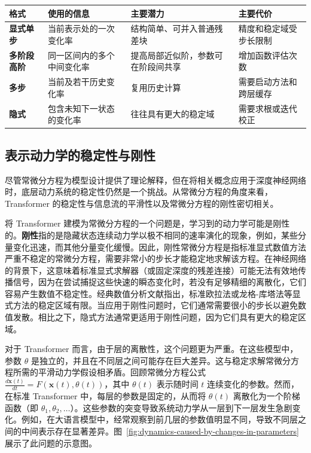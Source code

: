 \documentclass[UTF8,a4paper,zihao=-4,oneside,openany]{ctexbook}
\begin{document}
\begin{center}
\begin{tabularx}{\linewidth}{>{\bfseries}lXXX}
    \toprule
    格式 & 使用的信息 & 主要潜力 & 主要代价 \\
    \midrule
    显式单步
      & 当前表示处的一次变化率
      & 结构简单、可并入普通残差块
      & 精度和稳定域受步长限制 \\
    多阶段高阶
      & 同一区间内的多个中间变化率
      & 提高局部近似阶，参数可在阶段间共享
      & 增加函数评估次数 \\
    多步
      & 当前及若干历史变化率
      & 复用历史计算
      & 需要启动方法和跨层缓存 \\
    隐式
      & 包含未知下一状态的变化率
      & 往往具有更大的稳定域
      & 需要求根或迭代校正 \\
    \bottomrule
\end{tabularx}
\end{center}


\subsection{表示动力学的稳定性与刚性}

尽管常微分方程为模型设计提供了理论解释，但在将相关概念应用于深度神经网络时，底层动力系统的稳定性仍然是一个挑战。从常微分方程的角度来看，Transformer 的稳定性与信息流的平滑性以及常微分方程的刚性密切相关。

将 Transformer 建模为常微分方程的一个问题是，学习到的动力学可能是刚性的。\textbf{刚性}指的是隐藏状态连续动力学以极不相同的速率演化的现象，例如，某些分量变化迅速，而其他分量变化缓慢。因此，刚性常微分方程是指标准显式数值方法严重不稳定的常微分方程，需要非常小的步长才能稳定地求解该方程。在神经网络的背景下，这意味着标准显式求解器（或固定深度的残差连接）可能无法有效地传播信号，因为在尝试捕捉这些快速的瞬态变化时，若没有足够精细的离散化，它们容易产生数值不稳定性。经典数值分析文献指出，标准欧拉法或龙格-库塔法等显式方法的稳定区域有限。当应用于刚性问题时，它们通常需要很小的步长以避免数值发散。相比之下，隐式方法通常更适用于刚性问题，因为它们具有更大的稳定区域。

对于 Transformer 而言，由于层的离散性，这个问题更为严重。在这些模型中，参数 $\theta$ 是独立的，并且在不同层之间可能存在巨大差异。这与稳定求解常微分方程所需的平滑动力学假设相矛盾。回顾常微分方程公式 $\frac{d\mathbf{x}(t)}{dt} = F(\mathbf{x}(t),\theta(t))$，其中 $\theta(t)$ 表示随时间 $t$ 连续变化的参数。然而，在标准 Transformer 中，每层的参数是固定的，从而将 $\theta(t)$ 离散化为一个阶梯函数（即 $\theta_1, \theta_2, \dots$）。这些参数的突变导致系统动力学从一层到下一层发生急剧变化。例如，在大语言模型中，经常观察到前几层的参数值明显不同，导致不同层之间的中间表示存在显著差异。图~\ref{fig:dynamics-caused-by-changes-in-parameters} 展示了此问题的示意图。
\end{document}
